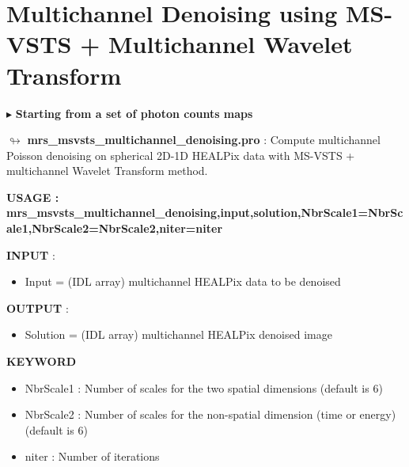 \section{Multichannel Denoising using MS-VSTS + Multichannel Wavelet Transform}


\vspace{0.3cm}

$\blacktriangleright$   \textbf {Starting from a set of photon counts maps}

\vspace{0.3cm}

$\looparrowright$ \textbf{mrs\_msvsts\_multichannel\_denoising.pro} :  Compute multichannel Poisson denoising on spherical 2D-1D HEALPix data with MS-VSTS + multichannel Wavelet Transform method.

\begin{center}
 \bf{USAGE : mrs\_msvsts\_multichannel\_denoising,input,solution,NbrScale1=NbrScale1,NbrScale2=NbrScale2,niter=niter
}
\end{center}

\textbf{INPUT} : 
\begin{itemize}
\item{Input = (IDL array) multichannel HEALPix data to be denoised}
\end{itemize}

\textbf{OUTPUT} : 
\begin{itemize}
\item{Solution = (IDL array) multichannel HEALPix denoised image}
\end{itemize}

\textbf{KEYWORD}

\begin{itemize}
  \item NbrScale1 : Number of scales for the two spatial dimensions (default is 6)
  \item NbrScale2 : Number of scales for the non-spatial dimension (time or energy) (default is 6)
  \item niter  : Number of iterations
\end{itemize}

\vspace{0.3cm}



